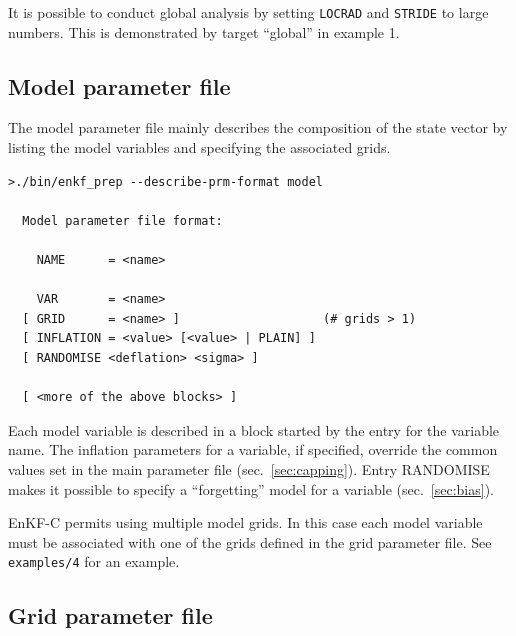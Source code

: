 \documentclass[11pt]{report}
\begin{document}
It is possible to conduct global analysis by setting \verb|LOCRAD| and \verb|STRIDE| to large numbers.
This is demonstrated by target ``global'' in example 1.

\subsection{Model parameter file}
\label{sec:modelprm}

The model parameter file mainly describes the composition of the state vector by listing the model variables and specifying the associated grids.

\begin{Verbatim}[frame=single,fontsize=\footnotesize]
>./bin/enkf_prep --describe-prm-format model

  Model parameter file format:

    NAME      = <name>

    VAR       = <name>
  [ GRID      = <name> ]                    (# grids > 1)
  [ INFLATION = <value> [<value> | PLAIN] ]
  [ RANDOMISE <deflation> <sigma> ]

  [ <more of the above blocks> ]
\end{Verbatim}

Each model variable is described in a block started by the entry for the variable name.
The inflation parameters for a variable, if specified, override the common values set in the main parameter file (sec.~\ref{sec:capping}).
Entry RANDOMISE makes it possible to specify a ``forgetting'' model for a variable (sec.~\ref{sec:bias}).

EnKF-C permits using multiple model grids.
In this case each model variable must be associated with one of the grids defined in the grid parameter file.
See \verb|examples/4| for an example.

\subsection{Grid parameter file}
\label{sec:gridprm}
\end{document}
